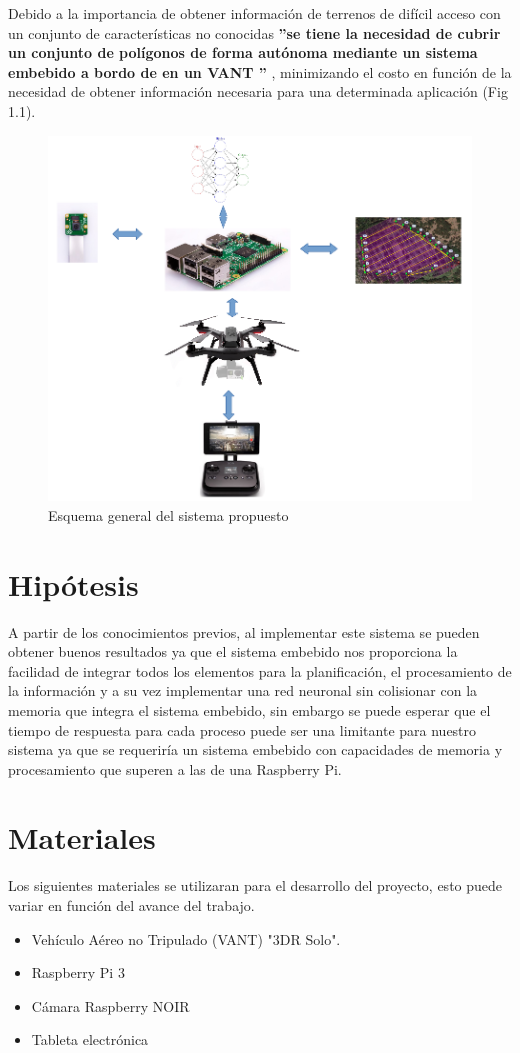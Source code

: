 \documentclass[]{report}
\begin{document}
Debido a la importancia de  obtener información de terrenos  de difícil acceso con un conjunto de características no conocidas {\bfseries ''se tiene la necesidad de cubrir un conjunto de polígonos de forma autónoma mediante un sistema embebido a bordo de en un VANT ''} , minimizando el costo en función de la necesidad de obtener información necesaria para una determinada aplicación (Fig 1.1).
\begin{figure}[!h]
	\centering
	\includegraphics[width=.6\textwidth]{sistema}
	\caption{Esquema general del sistema propuesto}
	\label{Vista ventral}
\end{figure}


\section{Hipótesis}
A partir de los conocimientos previos, al implementar este sistema se pueden obtener buenos resultados ya que el sistema embebido nos proporciona la facilidad de integrar todos los elementos para la planificación, el procesamiento de la información y a su vez implementar una red neuronal sin colisionar con la memoria que integra el sistema embebido, sin embargo se puede esperar que el tiempo de respuesta para cada proceso puede ser una limitante para nuestro sistema ya que se requeriría un sistema embebido con capacidades de memoria y procesamiento que superen a las de una Raspberry Pi.

\section{Materiales}
Los siguientes materiales se utilizaran para el desarrollo del proyecto, esto puede variar en función del avance del trabajo.
\begin{itemize}
	\item Vehículo Aéreo no Tripulado (VANT) "3DR Solo".
	\item Raspberry Pi 3
	\item Cámara Raspberry NOIR
	\item Tableta electrónica
	
\end{itemize}
\end{document}
